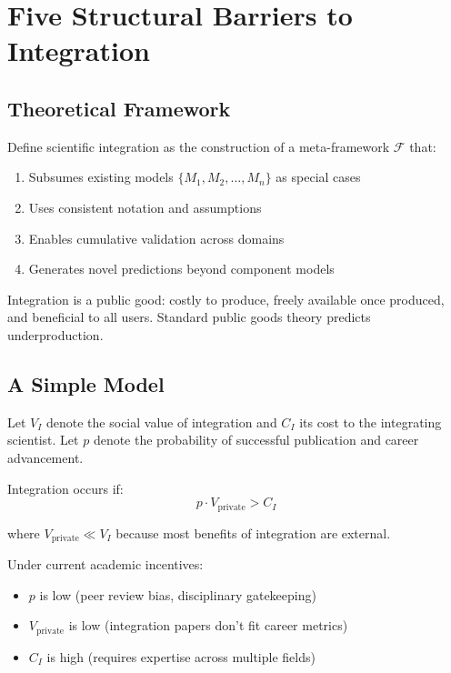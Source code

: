 \documentclass[12pt,a4paper]{article}
\begin{document}
\section{Five Structural Barriers to Integration}
\label{sec:barriers}

\subsection{Theoretical Framework}

Define scientific integration as the construction of a meta-framework $\mathcal{F}$ that:
\begin{enumerate}[nosep]
\item Subsumes existing models $\{M_1, M_2, \ldots, M_n\}$ as special cases
\item Uses consistent notation and assumptions
\item Enables cumulative validation across domains
\item Generates novel predictions beyond component models
\end{enumerate}

Integration is a public good: costly to produce, freely available once produced, and beneficial to all users. Standard public goods theory predicts underproduction.

\subsection{A Simple Model}

Let $V_I$ denote the social value of integration and $C_I$ its cost to the integrating scientist. Let $p$ denote the probability of successful publication and career advancement.

Integration occurs if:
\begin{equation}
p \cdot V_{\text{private}} > C_I
\end{equation}

where $V_{\text{private}} \ll V_I$ because most benefits of integration are external.

Under current academic incentives:
\begin{itemize}[nosep]
\item $p$ is low (peer review bias, disciplinary gatekeeping)
\item $V_{\text{private}}$ is low (integration papers don't fit career metrics)
\item $C_I$ is high (requires expertise across multiple fields)
\end{itemize}
\end{document}
